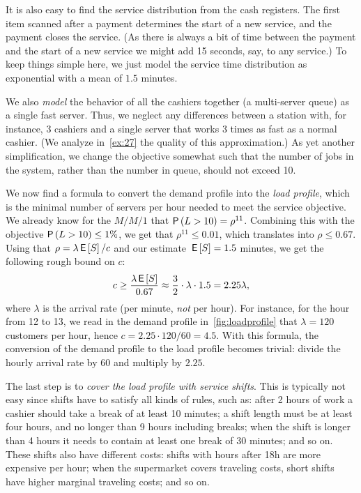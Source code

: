 It is also easy to find the service distribution from the cash registers.
The first item scanned after a payment determines the start of a new service, and the payment closes the service.
(As there is always a bit of time between the payment and the start of a new service we might add 15 seconds, say, to any service.)
To keep things simple here, we just model the service time distribution as exponential with a mean of $1.5$ minutes.

We also \emph{model} the behavior of all the cashiers together (a multi-server queue) as a single fast server.
Thus, we neglect any differences between a station with, for instance, 3 cashiers and a single server that works 3 times as fast as a normal cashier.
(We analyze in~\cref{ex:27} the quality of this approximation.)
As yet another simplification, we change the objective somewhat such that the number of jobs in the system, rather than the number in queue, should not exceed 10.

We now find a formula to convert the demand profile into the \emph{load profile}, which is the minimal number of servers per hour needed to meet the service objective. We already know for the $M/M/1$ that $\P{L>10}=\rho^{11}$. Combining this with the objective $\P{L>10}\leq 1\%$, we get that $\rho^{11}\leq 0.01$, which translates into $\rho \leq 0.67$. Using that $\rho = \lambda \,\mathsf{E}\left[S\right]/c$ and our estimate $\,\mathsf{E}\left[S\right]=1.5$ minutes, we get the following rough bound on $c$:
\begin{equation*}
c \geq \frac{\lambda \,\mathsf{E}\left[S\right]}{0.67} \approx \frac{3}2 \cdot \lambda \cdot 1.5 = 2.25 \lambda,
\end{equation*}
where $\lambda$ is the arrival rate (per minute, \emph{not} per hour).
For instance, for the hour from 12 to 13, we read in the demand profile in~\cref{fig:loadprofile} that $\lambda= 120$ customers per hour, hence $c=2.25 \cdot 120/60 = 4.5$. With this formula, the conversion of the demand profile to the load profile becomes trivial: divide the hourly arrival rate by $60$ and multiply by
$2.25$.

The last step is to \emph{cover the load profile with service shifts}.
This is typically not easy since shifts have to satisfy all kinds of rules, such as: after 2 hours of work a cashier should take a break of at least 10 minutes; a shift length must be at least four hours, and no longer than 9 hours including breaks; when the shift is longer than 4 hours it needs to contain at least one break of 30 minutes; and so on.
These shifts also have different costs: shifts with hours after 18h are more expensive per hour; when the supermarket covers traveling costs, short shifts have higher marginal traveling costs; and so on.

